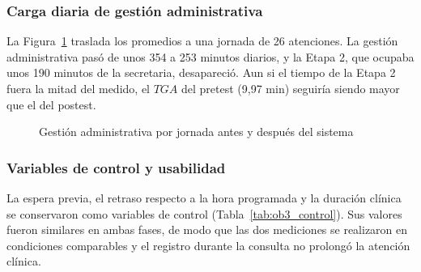 \subsubsection{Carga diaria de gestión administrativa}

La Figura~\ref{fig:ob3_jornada} traslada los promedios a una jornada de 26 atenciones. La gestión administrativa pasó de unos 354 a 253 minutos diarios, y la Etapa 2, que ocupaba unos 190 minutos de la secretaria, desapareció. Aun si el tiempo de la Etapa 2 fuera la mitad del medido, el $TGA$ del pretest (9,97 min) seguiría siendo mayor que el del postest.

\begin{figure}[H]
\centering
{}
\caption{Gestión administrativa por jornada antes y después del sistema}
\label{fig:ob3_jornada}
\end{figure}

\subsubsection{Variables de control y usabilidad}

La espera previa, el retraso respecto a la hora programada y la duración clínica se conservaron como variables de control (Tabla~\ref{tab:ob3_control}). Sus valores fueron similares en ambas fases, de modo que las dos mediciones se realizaron en condiciones comparables y el registro durante la consulta no prolongó la atención clínica.

